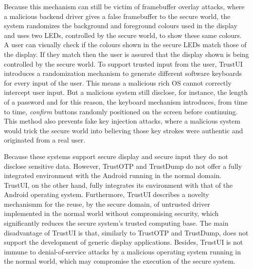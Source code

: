 Because this mechanism can still be victim of framebuffer overlay attacks, where a malicious backend driver gives a false framebuffer to the secure world, the system randomizes the background and foreground colours used in the display and uses two LEDs, controlled by the secure world, to show these same colours. A user can visually check if the colours shown in the secure LEDs match those of the display. If they match then the user is assured that the display shown is being controlled by the secure world. To support trusted input from the user, TrustUI introduces a randomization mechanism to generate different software keyboards for every input of the user. This means a malicious rich OS cannot correctly intercept user input. But a malicious system still disclose, for instance, the length of a password and for this reason, the keyboard mechanism introduces, from time to time, \emph{confirm} buttons randomly positioned on the screen before continuing. This method also prevents fake key injection attacks, where a malicious system would trick the secure world into believing those key strokes were authentic and originated from a real user.

Because these systems support secure display and secure input they do not disclose sensitive data. However, TrustOTP and TrustDump do not offer a fully integrated environment with the Android running in the normal domain. TrustUI, on the other hand, fully integrates its environment with that of the Android operating system. Furthermore, TrustUI describes a novelty mechanismm for the reuse, by the secure domain, of untrusted driver implemented in the normal world without compromising security, which significantly reduces the secure system's trusted computing base. The main disadvantage of TrustUI is that, similarly to TrustOTP and TrustDump, does not support the development of generic display applications. Besides, TrustUI is not immune to denial-of-service attacks by a malicious operating system running in the normal world, which may compromise the execution of the secure system.